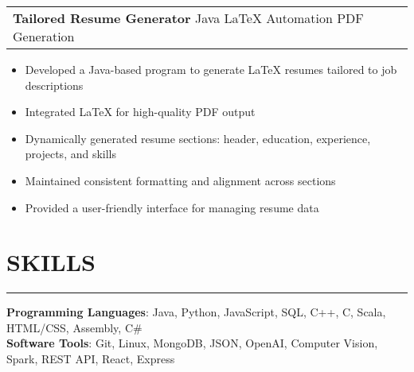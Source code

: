 \documentclass[a4paper,10pt]{article}
\begin{document}
\vspace{10pt}
\begin{tabularx}{\textwidth}{@{}lXr@{}}
\textbf{Tailored Resume Generator} \textbar{} Java \textbar{} LaTeX \textbar{} Automation \textbar{} PDF Generation \\
\end{tabularx}
\begin{itemize}[leftmargin=*,label=\textbullet]
  \item Developed a Java-based program to generate LaTeX resumes tailored to job descriptions
  \item Integrated LaTeX for high-quality PDF output
  \item Dynamically generated resume sections: header, education, experience, projects, and skills
  \item Maintained consistent formatting and alignment across sections
  \item Provided a user-friendly interface for managing resume data
\end{itemize}
\vspace{10pt}
\section*{\large SKILLS}
\vspace{-18pt}
\noindent\rule{\textwidth}{0.4pt}
\vspace{5pt}
\textbf{Programming Languages}: Java, Python, JavaScript, SQL, C++, C, Scala, HTML/CSS, Assembly, C\#\\
\textbf{Software Tools}: Git, Linux, MongoDB, JSON, OpenAI, Computer Vision, Spark, REST API, React, Express\\
\end{document}
